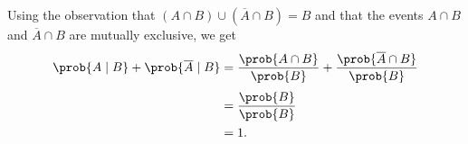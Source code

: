 Using the observation that $(A\cap B)\cup(\overline{A}\cap B)=B$ and that the events $A\cap B$ and $\overline{A}\cap B$ are mutually exclusive, we get
\begin{align*}
    \prob{A\mid B}+\prob{\overline{A}\mid B} &= \frac{\prob{A\cap B}}{\prob{B}}+\frac{\prob{\overline{A}\cap B}}{\prob{B}} \\[1mm]
    &= \frac{\prob{B}}{\prob{B}} \\
    &= 1.
\end{align*}
